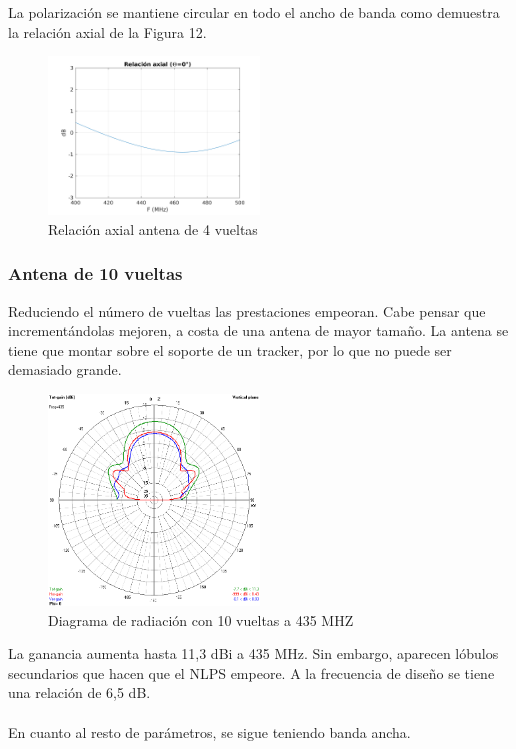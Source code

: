 \documentclass[12pt]{article}
\begin{document}
La polarización se mantiene circular en todo el ancho de banda como demuestra la relación axial de la Figura 12.\\

\begin{figure}[H]
	\centering
	\includegraphics[width=0.5\textwidth]{helix_4_sweep_AR.png}
	\caption{Relación axial antena de 4 vueltas}
\end{figure}


\subsubsection*{Antena de 10 vueltas}
Reduciendo el número de vueltas las prestaciones empeoran. Cabe pensar que incrementándolas mejoren, a costa de una antena de mayor tamaño. La antena se tiene que montar sobre el soporte de un tracker, por lo que no puede ser demasiado grande.\\

\begin{figure}[H]
	\centering
	\includegraphics[width=0.5\textwidth]{helix_10_435_gain.png}
	\caption{Diagrama de radiación con 10 vueltas a 435 MHZ}
\end{figure}

La ganancia aumenta hasta 11,3 dBi a 435 MHz. Sin embargo, aparecen lóbulos secundarios que hacen que el NLPS empeore. A la frecuencia de diseño se tiene una relación de 6,5 dB.\\\\
En cuanto al resto de parámetros, se sigue teniendo banda ancha.\\
\end{document}
